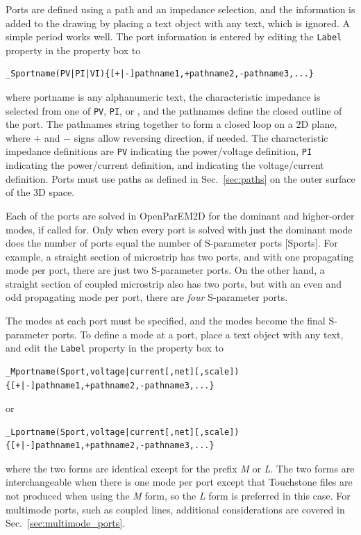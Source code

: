 \documentclass[titlepage]{article}
\renewcommand\_{\textunderscore\linebreak[1]}
\begin{document}
Ports are defined using a path and an impedance selection, and the information is added to the drawing by placing a text object with any text, which is ignored.  A simple period works well.  The port information is entered by editing the \texttt{Label} property in the property box to
\begin{Verbatim}[fontsize=\small]
  _Sportname(PV|PI|VI){[+|-]pathname1,+pathname2,-pathname3,...}
\end{Verbatim}
\noindent where portname is any alphanumeric text, the characteristic impedance is selected from one of \texttt{PV}, \texttt{PI}, or , and the pathnames define the closed outline of the port.  The pathnames string together to form a closed loop on a 2D plane, where $+$ and $-$ signs allow reversing direction, if needed.  The characteristic impedance definitions are \texttt{PV} indicating the power/voltage definition, \texttt{PI} indicating the power/current definition, and  indicating the voltage/current definition.  Ports must use paths as defined in Sec.~\ref{sec:paths} on the outer surface of the 3D space.

Each of the ports are solved in OpenParEM2D for the dominant and higher-order modes, if called for.  Only when every port is solved with just the dominant mode does the number of ports equal the number of S-parameter ports [Sports].  For example, a straight section of microstrip has two ports, and with one propagating mode per port, there are just two S-parameter ports.  On the other hand, a straight section of coupled microstrip also has two ports, but with an even and odd propagating mode per port, there are \textit{four} S-parameter ports.

The modes at each port must be specified, and the modes become the final S-parameter ports.  To define a mode at a port, place a text object with any text, and edit the \texttt{Label} property in the property box to
\begin{Verbatim}[fontsize=\small]
  _Mportname(Sport,voltage|current[,net][,scale]){[+|-]pathname1,+pathname2,-pathname3,...}
\end{Verbatim}
\noindent or
\begin{Verbatim}[fontsize=\small]
  _Lportname(Sport,voltage|current[,net][,scale]){[+|-]pathname1,+pathname2,-pathname3,...}
\end{Verbatim}
\noindent where the two forms are identical except for the prefix \textit{\_M} or \textit{\_L}.  The two forms are interchangeable when there is one mode per port except that Touchstone files are not produced when using the \textit{\_M} form, so the \textit{\_L} form is preferred in this case.  For multimode ports, such as coupled lines, additional considerations are covered in Sec.~\ref{sec:multimode_ports}.
  
\end{document}
